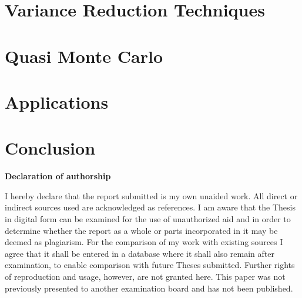 \documentclass[12pt]{article}
\theoremstyle{definition}
\begin{document}
\section{Variance Reduction Techniques}
\label{variance-control}


\section{Quasi Monte Carlo}
\label{QMC}


\section{Applications}
\label{applications}


\section{Conclusion}
\label{conclusion}


\newpage
    

\RaggedRight


\newpage



\Large
\noindent
\textbf{Declaration of authorship} 
\vspace{0.5cm}
\noindent
\normalsize

I hereby declare that the report submitted is my own unaided work. All direct 
or indirect sources used are acknowledged as references. I am aware that the 
Thesis in digital form can be examined for the use of unauthorized aid and in 
order to determine whether the report as a whole or parts incorporated in it may 
be deemed as plagiarism. For the comparison of my work with existing sources I 
agree that it shall be entered in a database where it shall also remain after 
examination, to enable comparison with future Theses submitted. Further rights 
of reproduction and usage, however, are not granted here. This paper was not 
previously presented to another examination board and has not been published.
\\
\end{document}
